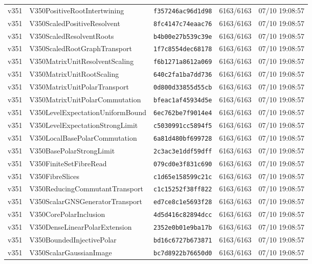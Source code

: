 \documentclass[11pt]{article}
\theoremstyle{definition}\newtheorem{deriv}{Derivation}
\begin{document}
{\begin{longtable}{@{}lllll@{}}
v351 & V350PositiveRootIntertwining & \texttt{f357246ac96d1d98} & 6163/6163 & 07/10 19:08:57 \\
v351 & V350ScaledPositiveResolvent & \texttt{8fc4147c74eaac76} & 6163/6163 & 07/10 19:08:57 \\
v351 & V350ScaledResolventRoots & \texttt{b4b00e27b539c39e} & 6163/6163 & 07/10 19:08:57 \\
v351 & V350ScaledRootGraphTransport & \texttt{1f7c8554dec68178} & 6163/6163 & 07/10 19:08:57 \\
v351 & V350MatrixUnitResolventScaling & \texttt{f6b1271a8612a069} & 6163/6163 & 07/10 19:08:57 \\
v351 & V350MatrixUnitRootScaling & \texttt{640c2fa1ba7dd736} & 6163/6163 & 07/10 19:08:57 \\
v351 & V350MatrixUnitPolarTransport & \texttt{0d800d33855d55cb} & 6163/6163 & 07/10 19:08:57 \\
v351 & V350MatrixUnitPolarCommutation & \texttt{bfeac1af45934d5e} & 6163/6163 & 07/10 19:08:57 \\
v351 & V350LevelExpectationUniformBound & \texttt{6ec762be7f9014e4} & 6163/6163 & 07/10 19:08:57 \\
v351 & V350LevelExpectationStrongLimit & \texttt{c5030991cc5894f5} & 6163/6163 & 07/10 19:08:57 \\
v351 & V350LocalBasePolarCommutation & \texttt{6a81d480bf699728} & 6163/6163 & 07/10 19:08:57 \\
v351 & V350BasePolarStrongLimit & \texttt{2c3ac3e1ddf59dff} & 6163/6163 & 07/10 19:08:57 \\
v351 & V350FiniteSetFibreRead & \texttt{079cd0e3f831c690} & 6163/6163 & 07/10 19:08:57 \\
v351 & V350FibreSlices & \texttt{c1d65e158599c21c} & 6163/6163 & 07/10 19:08:57 \\
v351 & V350ReducingCommutantTransport & \texttt{c1c15252f38ff822} & 6163/6163 & 07/10 19:08:57 \\
v351 & V350ScalarGNSGeneratorTransport & \texttt{ed7ce8c1e5693f28} & 6163/6163 & 07/10 19:08:57 \\
v351 & V350CorePolarInclusion & \texttt{4d5d416c82894dcc} & 6163/6163 & 07/10 19:08:57 \\
v351 & V350DenseLinearPolarExtension & \texttt{2352e0b01e9ba17b} & 6163/6163 & 07/10 19:08:57 \\
v351 & V350BoundedInjectivePolar & \texttt{bd16c6727b673871} & 6163/6163 & 07/10 19:08:57 \\
v351 & V350ScalarGaussianImage & \texttt{bc7d8922b76650d0} & 6163/6163 & 07/10 19:08:57 \\

\end{longtable}}
\end{document}
